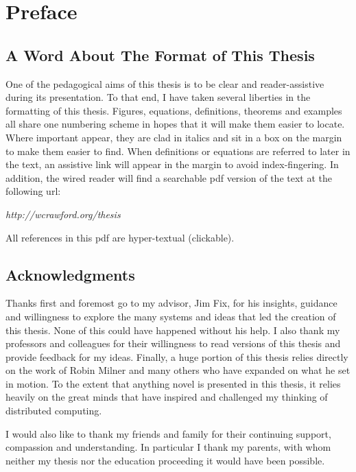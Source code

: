 \chapter*{Preface}
\section*{A Word About The Format of This Thesis}
One of the pedagogical aims of this thesis is to be clear and reader-assistive during its presentation.  To that end, I have taken several liberties in the formatting of this thesis.  Figures, equations, definitions, theorems and examples all share one numbering scheme in hopes that it will make them easier to locate. Where important  appear, they are clad in italics and sit in a box on the margin to make them easier to find.  When definitions or equations are referred to later in the text, an assistive link will appear in the margin to avoid index-fingering.  In addition, the wired reader will find a searchable pdf version of the text at the following url:
\begin{center}
	\emph{http://wcrawford.org/thesis}
\end{center}
All references in this pdf are hyper-textual (clickable).

\section*{Acknowledgments}
Thanks first and foremost go to my advisor, Jim Fix, for his insights, guidance and willingness to explore the many systems and ideas that led the creation of this thesis.  None of this could have happened without his help.  I also thank my professors and colleagues for their willingness to read versions of this thesis and provide feedback for my ideas.  Finally, a huge portion of this thesis relies directly on the work of Robin Milner and many others who have expanded on what he set in motion.  To the extent that anything novel is presented in this thesis, it relies heavily on the great minds that have inspired and challenged my thinking of distributed computing.

I would also like to thank my friends and family for their continuing support, compassion and understanding.  In particular I thank my parents, with whom neither my thesis nor the education proceeding it would have been possible.